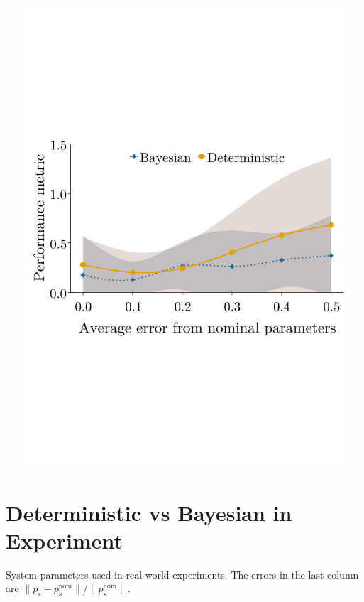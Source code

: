 \documentclass[
]{report}
\begin{document}
\includegraphics[width=7.8125in,height=6.77083in]{contents/assets/bandplot.svg}

\hypertarget{deterministic-vs-bayesian-in-experiment}{%
\section{Deterministic vs Bayesian in
Experiment}\label{deterministic-vs-bayesian-in-experiment}}

System parameters used in real-world experiments. The errors in the last
column are
\(\|p_s - p^{\textrm{nom}}_{s}\| / \|p^{\textrm{nom}}_{s}\|\).

~
\end{document}
